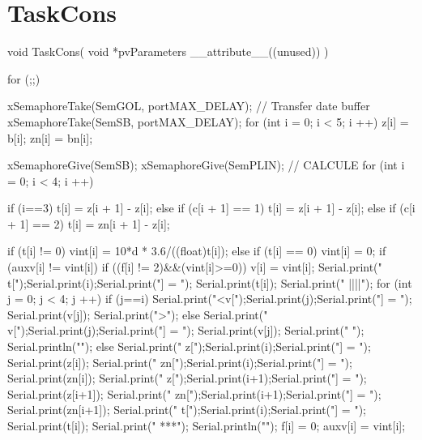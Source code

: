 \section{TaskCons} \label{tc}
\begin{verbnobox}[\verbarg]
void TaskCons( void *pvParameters __attribute__((unused)) )  
{
  for (;;)
  {

    xSemaphoreTake(SemGOL, portMAX_DELAY);
    // Transfer date buffer
    xSemaphoreTake(SemSB, portMAX_DELAY);
    for (int i = 0; i < 5; i ++) { 
      z[i] = b[i];
      zn[i] = bn[i];
    }

    xSemaphoreGive(SemSB);
    xSemaphoreGive(SemPLIN);
    //  CALCULE
    for (int i = 0; i < 4; i ++) {
      if (i==3)
        t[i] = z[i + 1] - z[i];
      else if (c[i + 1] == 1)
        t[i] = z[i + 1] - z[i];
      else if (c[i + 1] == 2)
        t[i] = zn[i + 1] - z[i];
      
      if (t[i] != 0)
        vint[i] = 10*d * 3.6/((float)t[i]);
      else if (t[i] == 0) 
        vint[i] = 0;
      if (auxv[i] != vint[i]){
        if ((f[i] != 2)&&(vint[i]>=0)){
          v[i] = vint[i];
          Serial.print("  t[");Serial.print(i);Serial.print("] = ");
          Serial.print(t[i]);
          Serial.print("  ||||");
          for (int j = 0; j < 4; j ++) {
            if (j==i){
              Serial.print("<v[");Serial.print(j);Serial.print("] = ");
              Serial.print(v[j]);
              Serial.print(">");
            }
            else {
              Serial.print(" v[");Serial.print(j);Serial.print("] = ");
              Serial.print(v[j]);     
              Serial.print(" ");
            }
           }
        Serial.println("");
        }
        else {Serial.print("  z[");Serial.print(i);Serial.print("] = ");
          Serial.print(z[i]);
          Serial.print("  zn[");Serial.print(i);Serial.print("] = ");
          Serial.print(zn[i]);
          Serial.print("  z[");Serial.print(i+1);Serial.print("] = ");
          Serial.print(z[i+1]);
          Serial.print("  zn[");Serial.print(i+1);Serial.print("] = ");
          Serial.print(zn[i+1]);
          Serial.print("  t[");Serial.print(i);Serial.print("] = ");
          Serial.print(t[i]);
          Serial.print(" ***");
        Serial.println("");
          f[i] = 0;
        }
      }  
      auxv[i] = vint[i];
      
}}}
\end{verbnobox}
